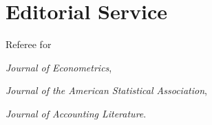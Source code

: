 \documentclass[10pt,letterpaper]{article}
\renewenvironment{itemize}{
  \begin{list}{}{
      \setlength{\leftmargin}{1.5em}
      \setlength{\itemsep}{0.25em}
      \setlength{\parskip}{0pt}
      \setlength{\parsep}{0.25em}
    }
}{
  \end{list}
}
\begin{document}
\section*{Editorial Service}
\begin{itemize}
\item Referee for 
\begin{itemize}
  \item \textit{Journal of Econometrics}, 
  \item \textit{Journal of the American Statistical Association}, 
  \item \textit{Journal of Accounting Literature}.
\end{itemize}
\end{itemize}
%
\end{document}
